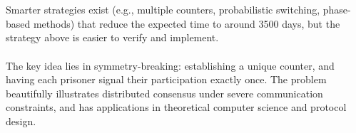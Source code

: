 \begin{solution}
    \\\\
    Smarter strategies exist (e.g., multiple counters, probabilistic switching, phase-based methods) that reduce the expected time to around 3500 days, but the strategy above is easier to verify and implement.
    \\\\
    The key idea lies in symmetry-breaking: establishing a unique counter, and having each prisoner signal their participation exactly once. The problem beautifully illustrates distributed consensus under severe communication constraints, and has applications in theoretical computer science and protocol design.
\end{solution}
